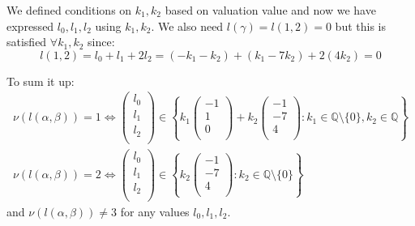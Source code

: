 \documentclass[12pt, a4paper]{article}
\begin{document}
We defined conditions on $k_1,k_2$ based on valuation value and now we have expressed $l_0,l_1,l_2$ using $k_1,k_2$. We also need $l(\gamma)=l(1,2)=0$ but this is satisfied $\forall k_1,k_2$ since:
\[
l(1,2) = l_0+l_1+2l_2 = (-k_1-k_2)+(k_1-7k_2)+2(4k_2) = 0
\]

To sum it up:
\begin{gather*}
\nu(l(\alpha,\beta)) = 1 \iff \begin{pmatrix}
l_0\\
l_1\\
l_2\\
\end{pmatrix} \in \left\{k_1\begin{pmatrix}
-1\\
1\\
0\\
\end{pmatrix} + k_2\begin{pmatrix}
-1\\
-7\\
4\\
\end{pmatrix}: k_1 \in \mathbb{Q}\setminus\{0\}, k_2 \in \mathbb{Q}\right\}\\
\nu(l(\alpha,\beta)) = 2 \iff \begin{pmatrix}
l_0\\
l_1\\
l_2\\
\end{pmatrix} \in \left\{k_2\begin{pmatrix}
-1\\
-7\\
4\\
\end{pmatrix}: k_2 \in \mathbb{Q}\setminus\{0\}\right\}
\end{gather*}
and $\nu(l(\alpha,\beta)) \neq 3$ for any values $l_0,l_1,l_2$.
\end{document}
